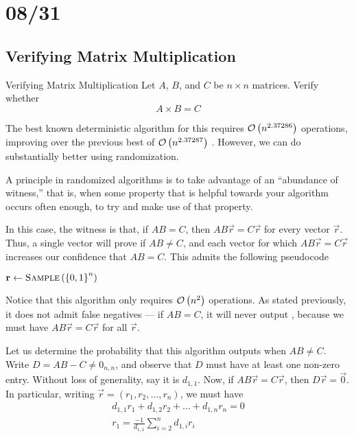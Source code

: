 \section{08/31}
\subsection{Verifying Matrix Multiplication}
\begin{problem}{Verifying Matrix Multiplication}{}
    Let $A$, $B$, and $C$ be $n \times n$ matrices. Verify whether
    \[A \times B = C\]
\end{problem}
The best known deterministic algorithm for this requires $\mathcal{O}\left(n^{2.37286}\right)$
operations, improving over the previous best of $\mathcal{O}\left(n^{2.37287}\right)$
\cite{alman2020refined}. However, we can do substantially better using
randomization.

A principle in randomized algorithms is to take advantage of an ``abundance of
witness,'' that is, when some property that is helpful towards your algorithm
occurs often enough, to try and make use of that property.

In this case, the witness is that, if $AB = C$, then $AB\vec{r} = C\vec{r}$ for
every vector $\vec{r}$. Thus, a single vector will prove if $AB \neq C$, and
each vector for which $AB\vec{r} = C\vec{r}$ increases our confidence that $AB =
C$. This admits the following pseudocode
\begin{algorithm}
    \caption{Verify Matrix Multiplication}
    \begin{algorithmic}[1]
            \State $\vec{r} \gets \Call{Sample}{\set{0,1}^n}$
                \State \Return \False
            \Else
                \State \Return \True
            \EndIf
        \EndFunction
    \end{algorithmic}
\end{algorithm}
Notice that this algorithm only requires $\mathcal{O}\left(n^2\right)$ operations. As stated
previously, it does not admit false negatives --- if $AB = C$, it will never
output \False, because we must have $AB\vec{r} = C\vec{r}$ for all $\vec{r}$.

Let us determine the probability that this algorithm outputs \True when $AB \neq
C$. Write $D = AB - C \neq 0_{n,n}$, and observe that $D$ must have at least one
non-zero entry. Without loss of generality, say it is $d_{1,1}$. Now, if
$AB\vec{r} = C\vec{r}$, then $D\vec{r} = \vec{0}$. In particular, writing
$\vec{r} = (r_1, r_2, \dots, r_n)$, we must have
\begin{align*}
    d_{1,1}r_1 + d_{1,2}r_2 + \dots + d_{1,n}r_n = 0\\
    r_1 = \frac{-1}{d_{1,1}}\sum_{i=2}^n d_{1,i}r_i
\end{align*}

